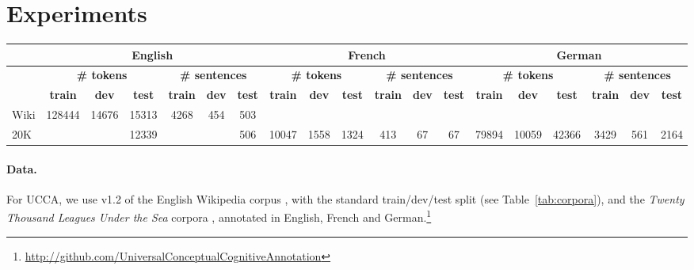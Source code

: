 \documentclass[11pt,a4paper]{article}
\begin{document}
\section{Experiments}\label{sec:experiments}

\begin{table*}[t]
\centering
\small
\setlength\tabcolsep{2pt}
\begin{tabular}{l|ccc|ccc||ccc|ccc||ccc|ccc}
& \multicolumn{6}{c||}{\footnotesize \bf English}
& \multicolumn{6}{c||}{\footnotesize \bf French}
& \multicolumn{6}{c}{\footnotesize \bf German} \\
\hline
& \multicolumn{3}{c|}{\footnotesize \bf {\#} tokens}
& \multicolumn{3}{c||}{\footnotesize \bf {\#} sentences}
& \multicolumn{3}{c|}{\footnotesize \bf {\#} tokens}
& \multicolumn{3}{c||}{\footnotesize \bf {\#} sentences}
& \multicolumn{3}{c|}{\footnotesize \bf {\#} tokens}
& \multicolumn{3}{c}{\footnotesize \bf {\#} sentences} \\
& \footnotesize \bf train & \footnotesize \bf dev & \footnotesize \bf test
& \footnotesize \bf train & \footnotesize \bf dev & \footnotesize \bf test
& \footnotesize \bf train & \footnotesize \bf dev & \footnotesize \bf test 
& \footnotesize \bf train & \footnotesize \bf dev & \footnotesize \bf test
& \footnotesize \bf train & \footnotesize \bf dev & \footnotesize \bf test
& \footnotesize \bf train & \footnotesize \bf dev & \footnotesize \bf test \\
\hline
Wiki & 128444 & 14676 & 15313 & 4268 & 454 & 503 &&&&&&&&&&&& \\
20K &&& 12339 &&& 506 & 10047 & 1558 & 1324 & 413 & 67 & 67 & 79894 & 10059 & 42366 & 3429 & 561 & 2164
\end{tabular}
\caption{Number of tokens and sentences in the training, development and test sets
we use for each corpus and language.\label{tab:corpora}}
\end{table*}

\paragraph{Data.}

For UCCA, we use v1.2 of the English Wikipedia corpus \cite[\textit{Wiki};][]{abend2013universal},
with the standard train/dev/test split (see Table~\ref{tab:corpora}),
and the \textit{Twenty Thousand Leagues Under the Sea} corpora
\cite[\textit{20K};][]{sulem2015conceptual},
annotated in English, French and German.\footnote{\url{http://github.com/UniversalConceptualCognitiveAnnotation}}
\end{document}
